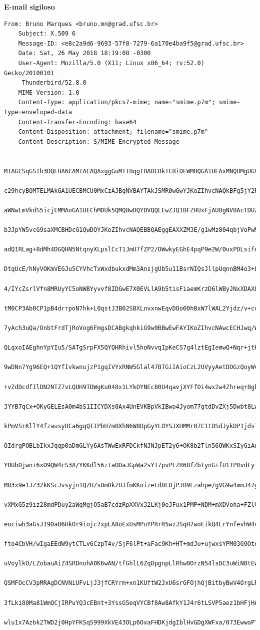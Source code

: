 \documentclass[
    article,            %
    11pt,               %
    oneside,            %
    a4paper,            %
    english,            %
    brazil,             %
    sumario=tradicional,
    ]{abntex2}
\begin{document}
    \textbf{E-mail sigiloso}
    \begin{Verbatim}[frame=single, commandchars=\\\{\}, fontsize=\footnotesize]
    From: Bruno Marques <bruno.mn@grad.ufsc.br>
    Subject: X.509 6
    Message-ID: <e8c2a9d6-9693-57f8-7279-6a170e4ba9f5@grad.ufsc.br>
    Date: Sat, 26 May 2018 18:19:08 -0300
    User-Agent: Mozilla/5.0 (X11; Linux x86_64; rv:52.0) Gecko/20100101
     Thunderbird/52.8.0
    MIME-Version: 1.0
    Content-Type: application/pkcs7-mime; name="smime.p7m"; smime-type=enveloped-data
    Content-Transfer-Encoding: base64
    Content-Disposition: attachment; filename="smime.p7m"
    Content-Description: S/MIME Encrypted Message

    MIAGCSqGSIb3DQEHA6CAMIACAQAxggGuMIIBqgIBADCBkTCBiDEWMBQGA1UEAxMNQUMgUGVz
    c29hcyBQMTELMAkGA1UECBMCU0MxCzAJBgNVBAYTAkJSMR0wGwYJKoZIhvcNAQkBFg5jY2RA
    aWNwLmVkdS5icjEMMAoGA1UEChMDUk5QMQ8wDQYDVQQLEwZJQ1BFZHUxFjAUBgNVBAcTDUZs
    b3JpYW5vcG9saXMCBHDcG1QwDQYJKoZIhvcNAQEBBQAEggEAXXZM3E/g1wMz804qbjVoPwMf
    adQ1RLag+8dMh4DGQHN5NtqnyXLpslCcT1JmU7fZP2/DWwkyEGhE4pqP9e2W/0uxPOLsifqv
    DtqUcE/hNyVOKmVEGJu5CYVhcTxWxdbukxdMm3AnsjgUb5u11BsrNIQsJllpUqnnBM4o3+LN
    4/IYcZsrlVfn8MRUyYC5oNWBYyvvf8IDGwE7X0EVLlA9b5tisFiaemKrzD6lWByJNxXDAX8c
    tM0CP3Ab0CP1pB4drrpoN7hk+L0qstJ3B02SBXLnvxnwEqvDOo00hBxW7lWAL2Yjdz/v+ccD
    7yAch3uQa/OnbtFrdTjRoVog6FmgsDCABgkqhkiG9w0BBwEwFAYIKoZIhvcNAwcECHJwq/WT
    QLqxoIAEghnYpYIu5/SATgSrpFX5QYQHRhivl5hoNvvqIpKeCS7g4lztEgIemwQ+Nqr+jtKw
    9wDNn7Yg96EQ+1QYfIvkwnujzP1gqIVYxRNW5Glal47BTGiIAioCzL2UVyyAetDOGzQoyWv2
    +vZdDcdfIlDN2NTZ7vLQUH9TDWgKu048x1LYkOYNEc80U4qavjXYFfOi4wx2w4Zhreq+BgkD
    3YYB7qCx+OKyGELEsA0m4bS1IICYDXs0Ax4UnEVKBpVkIBwo4Jyom77gtdDvZXj5Dwbt8LwO
    kPmVS+KllY4fzausyDCa6gqQIIPbH7m0XhN6W8DpGyYLOYSJXHMMr07C1tDSdJykDP1jdsTl
    QIdrgPOBLbIkxJqqp0aDmGLYy6AsTWwExRFDCkfNJNJpET2y6+OK8b2Tln56QWKxSIyGiAuK
    YOUbOjwn+6xO9QW4cS3A/YKKdl56ztaOOaJGpWa2sYI7pvPLZR6BfZbIynG+fU1TPRvdFy+O
    MB3x9e1JZ32kKScJvsyjn1QZHZsOmDkZUJfmKKoizeLdBLOjPJB9Lzahpe/gVG9w4mmJ47gm
    vXMxG5z9iz28mdPDuy2aWqMgjO5aB7cdzRpXXVx32LKj0eJFux1PMP+NDM+mXDVoha+FZlVe
    eociwh3aGsJ19DaB6HkOr9iojc7xpLA8oExUsMPuYPRrR5wzJSqH7woEikQ4LrYnfevhW4vk
    fto4CbVH/wIgaEEdW9ytCTLv6CzpT4v/SjF6lPt+aFac9Kh+HT+mdJu+ujwxsYPM03G9Otoe
    uVoylkO/LZobauAiZ4SRDnohA0K6wAN/tfGhlL6ZqDpgnpLlRhw0OrzN54lsDC3uWiN0tEwG
    QSMFOcCV3pMRAgDCNVNiUFvLjJ3jfCRYrm+xn1KUftW2JxU6srGFOjhQjBitbyBwV4OrgLR+
    3fLki80Ma81WmQCjIRPuYQ3cEBnt+3YssG5eqVYCBf8Aw8AfkY1J4r6tLSVP5aez1bHFjHA8
    wlu1x7Azbk2TWD2j0HpYFKSqS999XkVE43OLp6OxaFHDKjdgIblHvGDgXWFxa/073EwwoPTa

\end{Verbatim}
\end{document}
